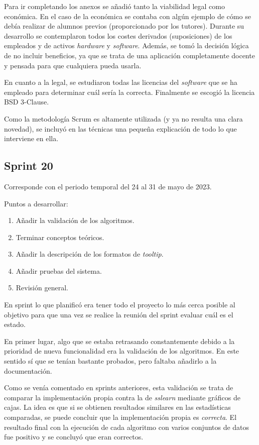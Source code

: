 Para ir completando los anexos se añadió tanto la viabilidad legal como
económica. En el caso de la económica se contaba con algún ejemplo de cómo se
debía realizar de alumnos previos (proporcionado por los tutores). Durante su
desarrollo se contemplaron todos los costes derivados (suposiciones) de los
empleados y de activos \textit{hardware} y \textit{software}. Además, se tomó la
decisión lógica de no incluir beneficios, ya que se trata de una aplicación
completamente docente y pensada para que cualquiera pueda usarla.

En cuanto a la legal, se estudiaron todas las licencias del \textit{software}
que se ha empleado para determinar cuál sería la correcta. Finalmente se escogió
la licencia BSD 3-Clause.

Como la metodología Scrum es altamente utilizada (y ya no resulta una clara
novedad), se incluyó en las técnicas una pequeña explicación de todo lo que
interviene en ella.

\subsection{Sprint 20}
Corresponde con el periodo temporal del 24 al 31 de mayo de 2023.

Puntos a desarrollar:
\begin{enumerate}
    \item Añadir la validación de los algoritmos.
    \item Terminar conceptos teóricos.
    \item Añadir la descripción de los formatos de \textit{tooltip}.
    \item Añadir pruebas del sistema.
    \item Revisión general.
\end{enumerate}

En sprint lo que planificó era tener todo el proyecto lo más cerca posible al
objetivo para que una vez se realice la reunión del sprint evaluar cuál es el
estado.

En primer lugar, algo que se estaba retrasando constantemente debido a la
prioridad de nueva funcionalidad era la validación de los algoritmos. En este
sentido sí que se tenían bastante probados, pero faltaba añadirlo a la
documentación.

Como se venía comentado en sprints anteriores, esta validación se trata de
comparar la implementación propia contra la de \emph{sslearn} mediante gráficos
de cajas. La idea es que si se obtienen resultados similares en las estadísticas
comparadas, se puede concluir que la implementación propia es \emph{correcta}.
El resultado final con la ejecución de cada algoritmo con varios conjuntos de
datos fue positivo y se concluyó que eran correctos.

